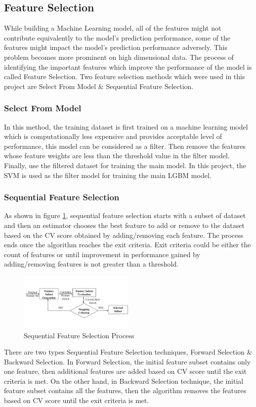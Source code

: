 \documentclass[twoside,11pt,a4paper]{article}
\begin{document}
\subsection{Feature Selection}
While building a Machine Learning model, all of the features might not contribute equivalently to the model's prediction performance, some of the features might impact the model's prediction performance adversely. This problem becomes more prominent on high dimensional data. The process of identifying the important features which improve the performance of the model is called Feature Selection. Two feature selection methods which were used in this project are Select From Model \& Sequential Feature Selection.
\subsubsection{Select From Model}
In this method, the training dataset is first trained on a machine learning model which is computationally less expensive and provides acceptable level of performance, this model can be considered as a filter. Then remove the features whose feature weights are less than the threshold value in the filter model. Finally, use the filtered dataset for training the main model. In this project, the \acs{SVM} is used as the filter model for training the main \acs{LGBM} model.
\subsubsection{Sequential Feature Selection}
As shown in figure \ref{fig:seq_feature_selection}, sequential feature selection starts with a subset of dataset and then an estimator chooses the best feature to add or remove to the dataset based on the \acf{CV} score obtained by adding/removing each feature. The process ends once the algorithm reaches the exit criteria. Exit criteria could be either the count of features or until improvement in performance gained by adding/removing features is not greater than a threshold.
\begin{figure}[ht]
	\centering
	\includegraphics[width=0.5\textwidth]{seq_feature_selection}
	\caption[Sequential Feature Selection Flowchart]{Sequential Feature Selection Process\citep{beyan2015detection}}
	\label{fig:seq_feature_selection}
\end{figure}
There are two types Sequential Feature Selection techniques, Forward Selection \& Backward Selection. In Forward Selection, the initial feature subset contains only one feature, then additional features are added based on \acs{CV} score until the exit criteria is met. On the other hand, in Backward Selection technique, the initial feature subset contains all the features, then the algorithm removes the features based on \acs{CV} score until the exit criteria is met. 
\end{document}
